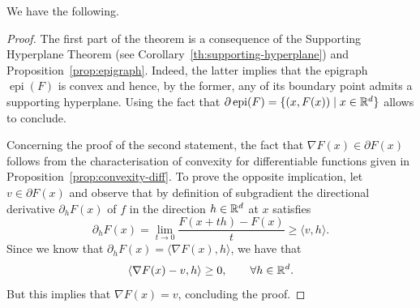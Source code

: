 \documentclass{report}
\begin{document}


We have the following.


\begin{proof}
	The first part of the theorem is a consequence of the Supporting Hyperplane Theorem (see Corollary~\ref{th:supporting-hyperplane}) and Proposition~\ref{prop:epigraph}. Indeed, the latter implies that the epigraph $\operatorname{epi}(F)$ is convex and hence, by the former, any of its boundary point admits a supporting hyperplane. Using the fact that $\partial\operatorname{epi}(F)=\{(x,F(x))\mid x\in\mathbb{R}^d\}$ allows to conclude.

	Concerning the proof of the second statement, the fact that $\nabla F(x)\in \partial F(x)$ follows from the characterisation of convexity for differentiable functions given in Proposition~\ref{prop:convexity-diff}.
	To prove the opposite implication, let $v\in \partial F(x)$ and observe that by definition of subgradient the directional derivative $\partial_h F(x)$ of $f$ in the direction $h\in\mathbb{R}^d$ at $x$ satisfies
	\begin{equation}
		\partial_h F(x) = \lim_{t\to 0} \frac{F(x+th)-F(x)}{t} \ge \langle v, h\rangle.
	\end{equation}
	Since we know that $\partial_hF (x)=\langle \nabla F(x),h\rangle$, we have that 
	\begin{equation}
		\langle \nabla F(x) - v,h\rangle \ge 0, \qquad \forall h\in\mathbb{R}^d.
	\end{equation}
	But this implies that $\nabla F(x)=v$, concluding the proof.
\end{proof}
\end{document}
